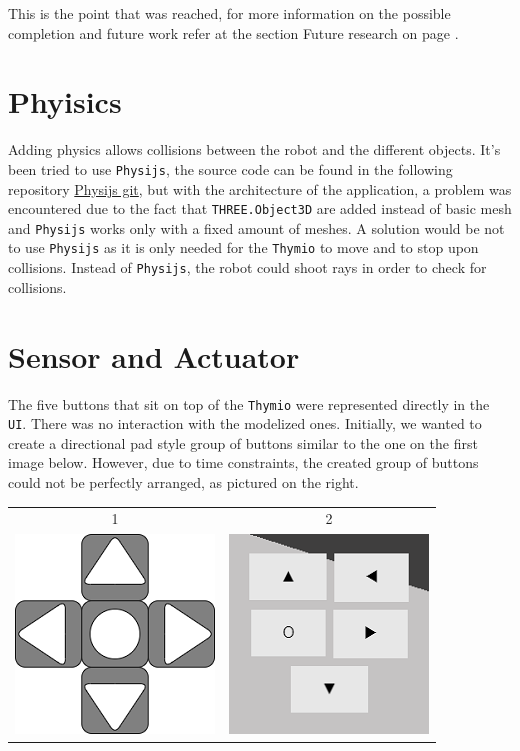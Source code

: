 \documentclass{scrreprt}
\begin{document}
This is the point that was reached, for more information on the possible completion and future work refer at the section Future research on page \pageref{future}.

\section{Phyisics}

Adding physics allows collisions between the robot and the different objects. It's been tried to use \texttt{Physijs}, the source code can be found in the following repository \href{https://github.com/chandlerprall/Physijs/wiki/Basic-Setup}{Physijs git}, 
but with the architecture of the application, a problem was encountered due to the fact that \texttt{THREE.Object3D} are added instead of basic mesh and \texttt{Physijs} works only with a fixed amount of meshes. A solution would be not to use \texttt{Physijs} as it is only needed for the \texttt{Thymio} to move and to stop upon collisions.
Instead of \texttt{Physijs}, the robot could shoot rays in order to check for collisions.

\section{Sensor and Actuator}

The five buttons that sit on top of the \texttt{Thymio} were represented directly in the \texttt{UI}. There was no interaction with the modelized ones. Initially, we wanted to create a directional pad style group of buttons similar to the one on the first image below. 
However, due to time constraints, the created group of buttons could not be perfectly arranged, as pictured on the right.

\begin{center}
  \begin{tabular}{c c}
	  1  & 2 \\
    \includegraphics{dpad} & \includegraphics{fake_dpad}
  \end{tabular}
\end{center}
\end{document}
